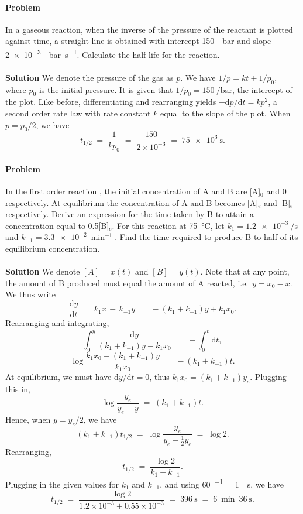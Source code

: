 \documentclass[10pt]{article}
\newcounter{prob}
\def\problem{\stepcounter{prob}\paragraph{Problem \arabic{prob}}}
\def\solution{\\\\\textbf{Solution }}
\begin{document}
        \problem In a gaseous reaction, when the inverse of the pressure of the reactant is plotted against time, a straight line is obtained with
        intercept \SI{150}{\per\bar} and slope \SI{2e-3}{\per\bar\per\s}. Calculate the half-life for the reaction.
        \solution We denote the pressure of the gas as $p$. We have $1 /p = kt + 1 /p_0$, where $p_0$ is the initial pressure.
        It is given that $1 /p_0 = \SI{150}{\per\bar}$, the intercept of the plot. Like before, differentiating and rearranging
        yields $-\mathrm{d}{p}/\mathrm{d}{t} = kp^2$, a second order rate law with rate constant $k$ equal to the slope of the plot.
        When $p = p_0 /2$, we have
        \[
        t_{1 /2} \;=\; \frac{1}{k p_0} \;=\; \frac{150}{2\times 10^{-3}} \;=\; \SI{75e3}{\s}.
        \]

        \problem In the first order reaction , the initial concentration of A and B are [A]$_0$ and 0 respectively.
        At equilibrium the concentration of A and B becomes [A]$_e$ and [B]$_e$ respectively.
        Derive an expression for the time taken by B to attain a concentration equal to 0.5[B]$_e$.
        For this reaction at \SI{75}{\celsius}, let $k_1 = \SI{1.2e-3}{\per\s}$ and $k_{-1} = \SI{3.3e-2}{\min^{-1}}$.
        Find the time required to produce B to half of its equilibrium concentration.
        \solution We denote $[A] = x(t)$ and $[B] = y(t)$. Note that at any point, the amount of B produced must equal the amount of
        A reacted, i.e.\ $y = x_0 - x$. We thus write
        \[
        \frac{\mathrm{d} y}{\mathrm{d}t} \;=\; k_1 x \,-\, k_{-1}y \;=\; -(k_1 + k_{-1})y + k_1x_0.
        \]
        Rearranging and integrating,
        \[
        \int_0^y \frac{\mathrm{d}{y}}{(k_1 + k_{-1})y - k_1x_0} \;=\; -\int_0^t \mathrm{d}{t},
        \]
        \[
        \log \frac{k_1x_0 - (k_1 + k_{-1})y}{k_1x_0}  \;=\; -(k_1 + k_{-1})t.
        \]
        At equilibrium, we must have $\mathrm{d}{y}/ \mathrm{d}{t} = 0$, thus $k_1x_0 = (k_1 + k_{-1})y_e$. Plugging this in,
        \[\log\frac{y_e}{y_e - y} \;=\; (k_1 + k_{-1})t.\]
        Hence, when $y = y_e / 2$, we have
        \[
        (k_1 + k_{-1})t_{1 / 2} \;=\; \log\frac{y_e}{y_e - \frac{1}{2}y_e} \;=\; \log{2}.
        \]
        Rearranging,
        \[
        t_{1 /2} \;=\; \frac{\log 2}{k_1 + k_{-1}}.
        \]
        Plugging in the given values for $k_1$ and $k_{-1}$, and using \SI{60}{\min^{-1}} = \SI{1}{\per\s}, we have
        \[
        t_{1 /2} \;=\; \frac{\log{2}}{1.2\times 10^{-3} + 0.55\times 10^{-3}} \;=\; \SI{396}{\s} \;=\; \SI{6}{\min}\:\SI{36}{\s}.
        \]
\end{document}
